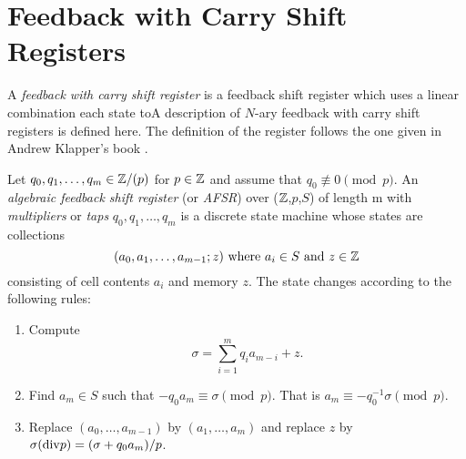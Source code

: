 \section{Feedback with Carry Shift Registers}

\par A {\em feedback with carry shift register} is a feedback shift register
which uses a linear combination each state toA description of $N$-ary feedback with
carry shift registers is defined here. The definition of the register follows the
one given in Andrew Klapper's book \cite{bk:gk12}.

\begin{definition}\label{afsr}
  Let $q_0,q_1,\dots,q_m\in\mathbb{Z}/(p)$ for $p\in\mathbb{Z}$ and assume that
  $q_0\not\equiv0\pmod p$.
  An {\em algebraic feedback shift register} (or {\em AFSR}) over ($\mathbb{Z}$,$p$,$S$)
  of length m with {\em multipliers} or {\em taps} $q_0,q_1,\dots,q_m$ is a discrete
  state machine whose states are  collections
  \[
	(a_0,a_1,\dots,a_{m-1};z) \ {\rm where} \ a_i\in S \ {\rm and} \ z \in \mathbb{Z}
  \]
  consisting of cell contents $a_i$ and memory $z$. The state changes according to
  the following rules:
  \begin{enumerate}[1.]
    \item Compute
      \[
      \sigma = \sum^m_{i=1}q_ia_{m-i}+z.
      \]
    \item Find $a_m\in S$ such that $-q_0a_m\equiv\sigma\pmod p$. That is
      $a_m\equiv-q_{0}^{-1}\sigma\pmod p$.
    \item Replace $(a_0,\dots,a_{m-1})$ by $(a_1,\dots,a_m)$ and replace $z$ by
      $\sigma({\rm div} p) = (\sigma+q_0a_m)/p$.
  \end{enumerate}
\end{definition}

